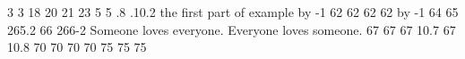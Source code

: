 \relax 
{} {{3}} 
 {{{}}{{3}}}
 {{18}} 
 {{20}} 
 {{21}} 
 {{23}} 
 {{5\relax }} 
 {{5\relax }} 
 {{.8}} 
 {{.10.2}} 
 {{the first part of example {\advance \excnt by -1 62}}} 
 {{62}}
 {{{}}{{62}}}
 {{{}}{{62}}}
 {{{\advance \excnt by -1 64}{\it {}}}} 
 {{65}} 
 {{{2}}{{65.2}}}
 {{66}} 
 {{{2}}{{66-2}}}
 {{Someone loves everyone.}} 
 {{Everyone loves someone.}} 
 {{67}} 
 {{{}}{{67}}}
 {{{}}{{67}}}
 {{10.7}} 
 {{{67}\relax }} 
 {{10.8}} 
 {{70}}
 {{{}}{{70}}}
 {{{}}{{70}}}
 {{{}}{{70}}}
 {{75}} 
 {{{}}{{75}}}
 {{{}}{{75}}}
